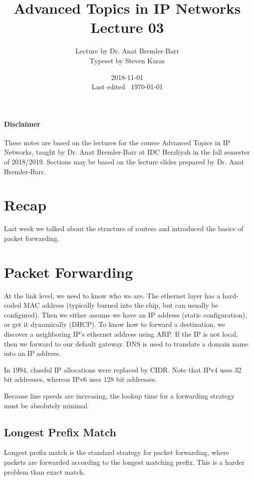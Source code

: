 \documentclass{idc_msc}
\title{Advanced Topics in IP Networks \\\large Lecture 03}
\date{2018-11-01 \\ Last edited \currenttime\ \today}
\author{Lecture by Dr. Anat Bremler-Barr\\Typeset by Steven Karas}
\begin{document}
\maketitle

\paragraph{Disclaimer}

These notes are based on the lectures for the course Advanced Topics in IP Networks, taught by Dr. Anat Bremler-Barr at IDC Herzliyah in the fall semester of 2018/2019.
Sections may be based on the lecture slides prepared by Dr. Anat Bremler-Barr.

\nocite{Varghese:2004:NAI:1203994}
\nocite{Crovella:2006:IMI:1196480}
\nocite{Kurose:2002:CNT:549735}

\section{Recap}

Last week we talked about the structure of routers and introduced the basics of packet forwarding.

\section{Packet Forwarding}

At the link level, we need to know who we are.
The ethernet layer has a hard-coded MAC address (typically burned into the chip, but can usually be configured).
Then we either assume we have an IP address (static configuration), or get it dynamically (DHCP).
To know how to forward a destination, we discover a neighboring IP's ethernet address using ARP.
If the IP is not local, then we forward to our default gateway.
DNS is used to translate a domain name into an IP address.

In 1994, classful IP allocations were replaced by CIDR. Note that IPv4 uses 32 bit addresses, whereas IPv6 uses 128 bit addresses.

Because line speeds are increasing, the lookup time for a forwarding strategy must be absolutely minimal.

\subsection{Longest Prefix Match}

Longest prefix match is the standard strategy for packet forwarding, where packets are forwarded according to the longest matching prefix.
This is a harder problem than exact match.
\end{document}

